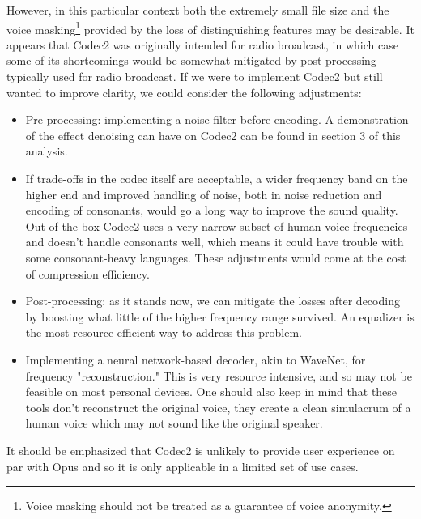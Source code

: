 \documentclass{article}
\begin{document}
However, in this particular context both the extremely small file size and the voice masking\footnote{Voice masking should not be treated as a guarantee of voice anonymity.} provided by the loss of distinguishing features may be desirable. It appears that Codec2 was originally intended for radio broadcast, in which case some of its shortcomings would be somewhat mitigated by post processing typically used for radio broadcast.
If we were to implement Codec2 but still wanted to improve clarity, we could consider the following adjustments:
\begin{itemize}
\item Pre-processing: implementing a noise filter before encoding. A demonstration of the effect denoising can have on Codec2 can be found in section 3 of this analysis.
\item If trade-offs in the codec itself are acceptable, a wider frequency band on the higher end and improved handling of noise, both in noise reduction and encoding of consonants, would go a long way to improve the sound quality. Out-of-the-box Codec2 uses a very narrow subset of human voice frequencies and doesn't handle consonants well, which means it could have trouble with some consonant-heavy languages. These adjustments would come at the cost of compression efficiency.

\item Post-processing: as it stands now, we can mitigate the losses after decoding by boosting what little of the higher frequency range survived. An equalizer is the most resource-efficient way to address this problem. 
\item Implementing a neural network-based decoder, akin to WaveNet, for frequency "reconstruction." \cite{wavenet} This is very resource intensive, and so may not be feasible on most personal devices. One should also keep in mind that these tools don't reconstruct the original voice, they create a clean simulacrum of a human voice which may not sound like the original speaker.
\end{itemize}
It should be emphasized that Codec2 is unlikely to provide user experience on par with Opus and so it is only applicable in a limited set of use cases.


\end{document}
